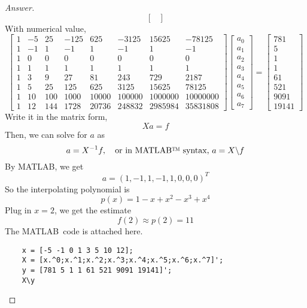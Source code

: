 \begin{proof}[Answer]
\[\begin{bmatrix}
\end{bmatrix}\]
With numerical value,
\[\begin{bmatrix}
1 &	-5	&	25	&	-125	&	625		&	-3125	&	15625	&	-78125	\\
1 &	-1	&	1	&	-1		&	1		&	-1		&	1		&	-1		\\
1 &	0	&	0	&	0		&	0		&	0		&	0		&	0		\\
1 &	1	&	1	&	1		&	1		&	1		&	1		&	1		\\
1 &	3	&	9	&	27		&	81		&	243		&	729		&	2187	\\
1 &	5	&	25	&	125		&	625		&	3125	&	15625	&	78125	\\
1 &	10	&	100	&	1000	&	10000	&	100000	&	1000000	&	10000000\\
1 &	12	&	144	&	1728	&	20736	&	248832	&	2985984	&	35831808
\end{bmatrix}
\begin{bmatrix}
a_0 \\ a_1 \\ a_2 \\ a_3 \\ a_4 \\ a_5 \\ a_6 \\ a_7
\end{bmatrix}=
\begin{bmatrix}
781 \\ 5 \\ 1 \\ 1 \\ 61 \\ 521 \\ 9091 \\ 19141
\end{bmatrix}\]
Write it in the matrix form,
\[ Xa=f \]
Then, we can solve for $a$ as
\[ a=X^{-1}f, \quad \textrm{or in MATLAB\texttrademark\ syntax, } a=X\backslash f \]
By MATLAB\texttrademark, we get
\[ a=(1,-1,1,-1,1,0,0,0)^T \]
So the interpolating polynomial is
\[ p(x)=1-x+x^2-x^3+x^4 \]
Plug in $x=2$, we get the estimate
\[ f(2) \approx p(2) = 11 \]
The MATLAB\texttrademark\ code is attached here.
\begin{lstlisting}
	x = [-5 -1 0 1 3 5 10 12];
	X = [x.^0;x.^1;x.^2;x.^3;x.^4;x.^5;x.^6;x.^7]';
	y = [781 5 1 1 61 521 9091 19141]';
	X\y
\end{lstlisting}
\end{proof}


